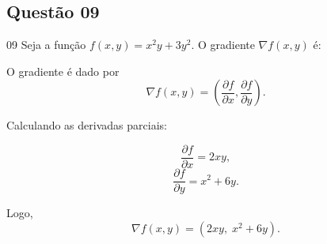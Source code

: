 \subsection*{Questão 09}

\begin{questionbox}{09}
  Seja a função $f(x,y) = x^2y + 3y^2$. O gradiente $\nabla f(x,y)$ é:
\end{questionbox}

\begin{solutionbox}
  O gradiente é dado por
  \[
  \nabla f(x,y) = \left( \frac{\partial f}{\partial x}, \frac{\partial f}{\partial y} \right).
  \]

  Calculando as derivadas parciais:

  \[
  \frac{\partial f}{\partial x} = 2xy,
  \]
  \[
  \frac{\partial f}{\partial y} = x^2 + 6y.
  \]

  Logo,
  \[
  \nabla f(x,y) = (2xy,\; x^2 + 6y).
  \]
\end{solutionbox}